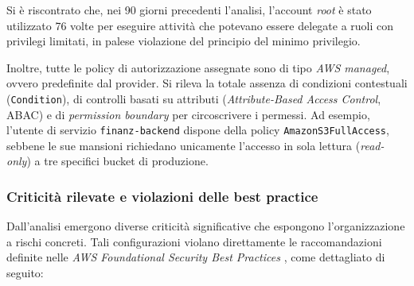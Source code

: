 Si è riscontrato che, nei 90 giorni precedenti l'analisi, l'account \emph{root} è stato utilizzato 76 volte per eseguire attività che potevano essere delegate a ruoli con privilegi limitati, in palese violazione del principio del minimo privilegio.

Inoltre, tutte le policy di autorizzazione assegnate sono di tipo \emph{AWS managed}, ovvero predefinite dal provider. Si rileva la totale assenza di condizioni contestuali (\texttt{Condition}), di controlli basati su attributi (\emph{Attribute-Based Access Control}, ABAC) e di \emph{permission boundary} per circoscrivere i permessi. Ad esempio, l'utente di servizio \texttt{finanz-backend} dispone della policy \texttt{AmazonS3FullAccess}, sebbene le sue mansioni richiedano unicamente l'accesso in sola lettura (\emph{read-only}) a tre specifici bucket di produzione.

\subsubsection*{Criticità rilevate e violazioni delle best practice}
Dall'analisi emergono diverse criticità significative che espongono l'organizzazione a rischi concreti. Tali configurazioni violano direttamente le raccomandazioni definite nelle \emph{AWS Foundational Security Best Practices} \cite{aws_security_foundational}, come dettagliato di seguito:

